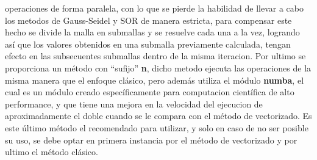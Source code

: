 \documentclass[letterpaper, openright, 12pt]{book}
\begin{document}
    operaciones de forma paralela, con lo que se pierde la habilidad de
    llevar a cabo los metodos de Gauss-Seidel y SOR de manera estricta,
    para compensar este hecho se divide la malla en submallas y se resuelve
    cada una a la vez, logrando así que los valores obtenidos en una
    submalla previamente calculada, tengan efecto en las subsecuentes
    submallas dentro de la misma iteracion. Por ultimo se proporciona un
    método con ``sufijo'' \textbf{\textunderscore n}, dicho metodo ejecuta
    las operaciones de la misma manera que el enfoque clásico, pero además
    utiliza el módulo \textbf{numba}, el cual es un módulo creado
    específicamente para computacion científica de alto performance, y que
    tiene una mejora en la velocidad del ejecucion de aproximadamente el
    doble cuando se le compara con el método de vectorizado. Es este último
    método el recomendado para utilizar, y solo en caso de no ser posible su
    uso, se debe optar en primera instancia por el método de
    vectorizado y por ultimo el método clásico.
\end{document}
